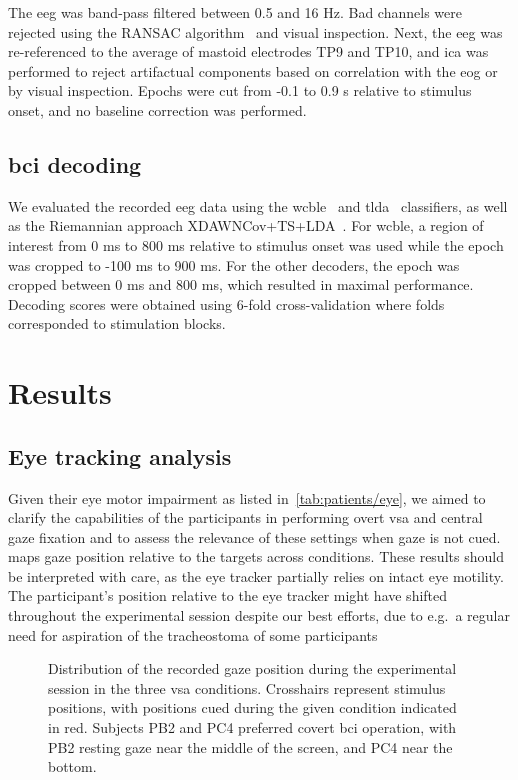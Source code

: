 \documentclass[twocolumn]{article}
\begin{document}
The \ac{eeg} was band-pass filtered between 0.5 and 16 Hz.
Bad channels were rejected using the RANSAC algorithm~\cite{Fischler1981}
and visual inspection.
Next, the \ac{eeg} was re-referenced to the average of mastoid electrodes TP9
and TP10, and \ac{ica} was performed to reject artifactual components based on
correlation with the \ac{eog} or by visual inspection.
Epochs were cut from -0.1 to 0.9 s relative to stimulus onset, and no baseline
correction was performed.

\subsection{\Acs{bci} decoding}

We evaluated the recorded \ac{eeg} data using the \ac{wcble}~\cite{VanDenKerchove2024}
and \ac{tlda}~\cite{Sosulski2022}
classifiers, as well as the Riemannian approach XDAWNCov+TS+LDA~\cite{Cecotti2017}.
For \ac{wcble}, a region of interest from 0 ms to 800 ms relative to stimulus
onset was used while the epoch was cropped to -100 ms to 900 ms. For the other
decoders, the epoch was cropped between 0 ms and 800 ms, which resulted in maximal
performance.
Decoding scores were obtained using 6-fold cross-validation where folds corresponded to
stimulation blocks.

\section{Results}



\subsection{Eye tracking analysis}
\label{sec:patients/outcomes/gaze}
Given their eye motor impairment as listed in~\cref{tab:patients/eye}, we aimed to clarify the
capabilities of the participants in performing overt \ac{vsa} and central gaze fixation and to
assess the relevance of these settings when gaze is not cued.
 maps gaze position relative to the targets
across conditions.
These results should be interpreted with care, as the eye tracker partially
relies on intact eye motility.
The participant's position relative to the eye tracker might have shifted
throughout the experimental session despite our best efforts, due to e.g.\ a
regular need for aspiration of the tracheostoma of some participants
\begin{figure}[t]
	\caption{%
		Distribution of the recorded gaze position during the experimental session in the three \ac{vsa}
		conditions.
		Crosshairs represent stimulus positions, with positions cued during
		the given condition indicated in red.
		Subjects PB2 and PC4 preferred covert \ac{bci} operation, with PB2 resting gaze
		near the middle of the screen, and PC4 near the bottom.
	}%
	\label{fig:patients/gaze}
\end{figure}
\end{document}
